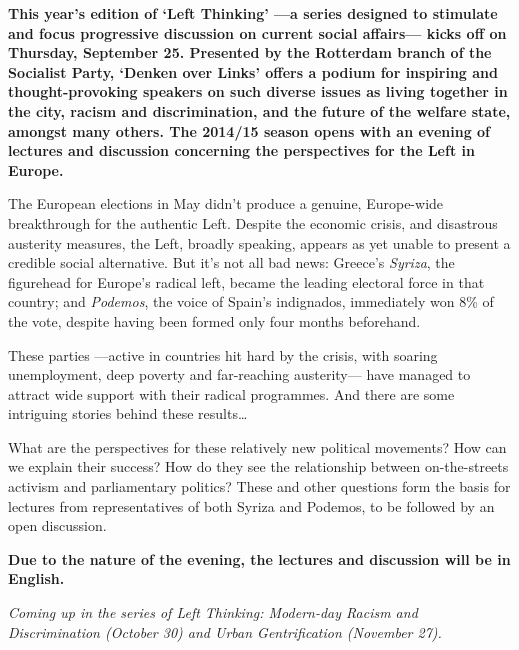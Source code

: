 \documentclass{article}
\begin{document}

\textbf{This year's edition of `Left Thinking' ---a series designed to
stimulate and focus progressive discussion on current social affairs--- kicks
off on Thursday, September 25. Presented by the Rotterdam branch of the
Socialist Party, `Denken over Links' offers a podium for inspiring and
thought-provoking speakers on such diverse issues as living together in the
city, racism and discrimination, and the future of the welfare state, amongst
many others. The 2014/15 season opens with an evening of lectures and
discussion concerning the perspectives for the Left in Europe.}

The European elections in May didn't produce a genuine, Europe-wide
breakthrough for the authentic Left. Despite the economic crisis, and
disastrous austerity measures, the Left, broadly speaking, appears as yet
unable to present a credible social alternative. But it's not all bad news:
Greece's \emph{Syriza}, the figurehead for Europe's radical left, became the
leading electoral force in that country; and \emph{Podemos}, the voice of
Spain's indignados, immediately won 8\% of the vote, despite having been formed
only four months beforehand.

These parties ---active in countries hit hard by the crisis, with soaring unemployment, 
deep poverty and far-reaching austerity--- have managed to attract wide support 
with their radical programmes. And there are some intriguing stories behind these 
results\dots

What are the perspectives for these relatively new political movements? How can 
we explain their success? How do they see the relationship between on-the-streets 
activism and parliamentary politics? These and other questions form the basis for 
lectures from representatives of both Syriza and Podemos, to be followed by an 
open discussion.

\textbf{Due to the nature of the evening, the lectures and discussion will be in English.}

\emph{Coming up in the series of Left Thinking: Modern-day Racism and Discrimination
(October 30) and Urban Gentrification (November 27).}

\DolFooter
\end{document}
